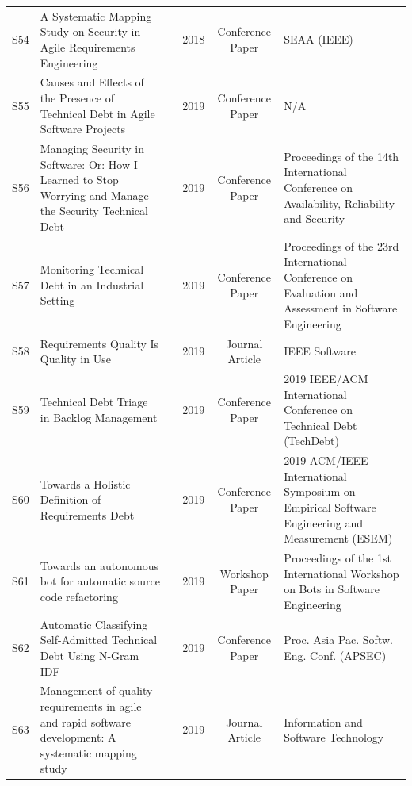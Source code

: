 \documentclass[12pt,reqno, twoside]{amsbook}
\theoremstyle{plain}
\numberwithin{equation}{chapter}
\numberwithin{section}{chapter}
\begin{document}
\begin{landscape}
\begin{center}
\begin{longtable}{|c|p{5cm}|p{4.5cm}|c|c|p{5.5cm}|}
S54 & A Systematic Mapping Study on Security in Agile Requirements Engineering & \citeauthor{Villamizar2018} & 2018 & Conference Paper & SEAA (IEEE) \\
S55 & Causes and Effects of the Presence of Technical Debt in Agile Software Projects & \citeauthor{Rios2019} & 2019 & Conference Paper & N/A \\
S56 & Managing Security in Software: Or: How I Learned to Stop Worrying and Manage the Security Technical Debt & \citeauthor{Rindell2019} & 2019 & Conference Paper & Proceedings of the 14th International Conference on Availability, Reliability and Security \\
S57 & Monitoring Technical Debt in an Industrial Setting & \citeauthor{Arvanitou2019} & 2019 & Conference Paper & Proceedings of the 23rd International Conference on Evaluation and Assessment in Software Engineering \\
S58 & Requirements Quality Is Quality in Use & \citeauthor{Femmer2019} & 2019 & Journal Article & IEEE Software \\
S59 & Technical Debt Triage in Backlog Management & \citeauthor{Besker2019} & 2019 & Conference Paper & 2019 IEEE/ACM International Conference on Technical Debt (TechDebt) \\
S60 & Towards a Holistic Definition of Requirements Debt & \citeauthor{Lenarduzzi2019} & 2019 & Conference Paper & 2019 ACM/IEEE International Symposium on Empirical Software Engineering and Measurement (ESEM) \\
S61 & Towards an autonomous bot for automatic source code refactoring & \citeauthor{Wyrich2019} & 2019 & Workshop Paper & Proceedings of the 1st International Workshop on Bots in Software Engineering \\
S62 & Automatic Classifying Self-Admitted Technical Debt Using N-Gram {IDF} & \citeauthor{Wattanakriengkrai2019} & 2019 & Conference Paper & Proc. Asia Pac. Softw. Eng. Conf. (APSEC) \\
S63 & Management of quality requirements in agile and rapid software development: A systematic mapping study & \citeauthor{Behutiye2019} & 2019 & Journal Article & Information and Software Technology \\


\end{longtable}
\end{center}
\end{landscape}
\end{document}
